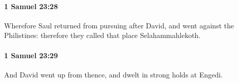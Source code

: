 		\paragraph{1 Samuel 23:28} %
			\label{1SAMUEL-23-28}

			Wherefore Saul returned from pursuing after David, and went against the Philistines: therefore they called that place Selahammahlekoth.


		\paragraph{1 Samuel 23:29} %
			\label{1SAMUEL-23-29}

			And David went up from thence, and dwelt in strong holds at Engedi.

